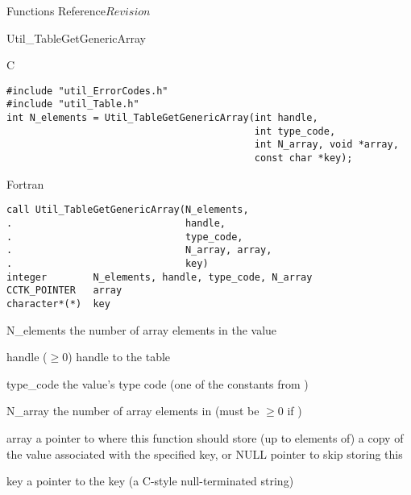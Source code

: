 \begin{cactuspart}{ Functions Reference}{}{$Revision$}
\begin{FunctionDescription}{Util\_TableGetGenericArray}
\begin{SynopsisSection}
\begin{Synopsis}{C}
\begin{verbatim}
#include "util_ErrorCodes.h"
#include "util_Table.h"
int N_elements = Util_TableGetGenericArray(int handle,
                                           int type_code,
                                           int N_array, void *array,
                                           const char *key);
\end{verbatim}
\end{Synopsis}
\begin{Synopsis}{Fortran}
\begin{verbatim}
call Util_TableGetGenericArray(N_elements,
.                              handle,
.                              type_code,
.                              N_array, array,
.                              key)
integer        N_elements, handle, type_code, N_array
CCTK_POINTER   array
character*(*)  key
\end{verbatim}
\end{Synopsis}
\end{SynopsisSection}

\begin{ResultSection}
\begin{Result}{N\_elements}
the number of array elements in the value
\end{Result}
\end{ResultSection}

\begin{ParameterSection}
\begin{Parameter}{handle ($\ge 0$)}
handle to the table
\end{Parameter}
\begin{Parameter}{type\_code}
the value's type code
(one of the  constants from )
\end{Parameter}
\begin{Parameter}{N\_array}
the number of array elements in 
(must be $\ge 0$ if )
\end{Parameter}
\begin{Parameter}{array}
a pointer to where this function should store (up to 
elements of) a copy of the value associated with the specified key,
or NULL pointer to skip storing this
\end{Parameter}
\begin{Parameter}{key}
a pointer to the key (a C-style null-terminated string)
\end{Parameter}
\end{ParameterSection}


\end{FunctionDescription}
\end{cactuspart}
